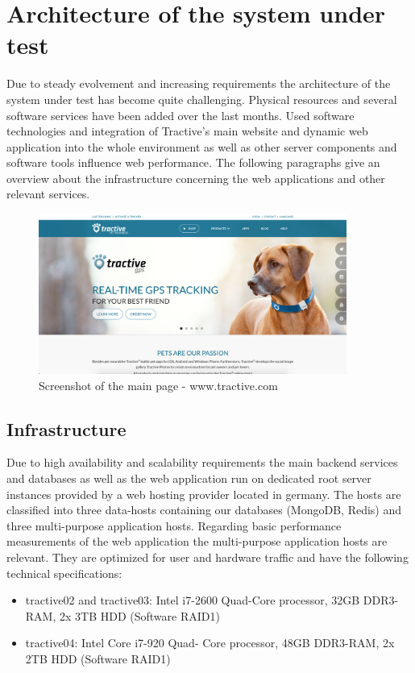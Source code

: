 \chapter{Architecture of the system under test}
\label{chap:architecture}

Due to steady evolvement and increasing requirements the architecture of the system under test has become quite challenging. Physical resources and several software services have been added over the last months. Used software technologies and integration of Tractive's main website and dynamic web application into the whole environment as well as other server components and software tools influence web performance. The following paragraphs give an overview about the infrastructure concerning the web applications and other relevant services.

\begin{figure}[h]
	\centering
		\includegraphics[width=0.9\textwidth]{imgs/tractive.png}
	\caption{Screenshot of the main page - www.tractive.com}
\end{figure}

\section{Infrastructure}
Due to high availability and scalability requirements the main backend services and databases as well as the web application run on dedicated root server instances provided by a web hosting provider located in germany. The hosts are classified into three data-hosts containing our databases (MongoDB, Redis) and three multi-purpose application hosts. Regarding basic performance measurements of the web application the multi-purpose application hosts are relevant. They are optimized for user and hardware traffic and have the following technical specifications:

\begin{itemize}
	\item{tractive02 and tractive03}: Intel i7-2600 Quad-Core processor, 32GB DDR3-RAM, 2x 3TB HDD (Software RAID1)
	\item{tractive04}: Intel Core i7-920 Quad- Core processor, 48GB DDR3-RAM, 2x 2TB HDD (Software RAID1)
\end{itemize}

